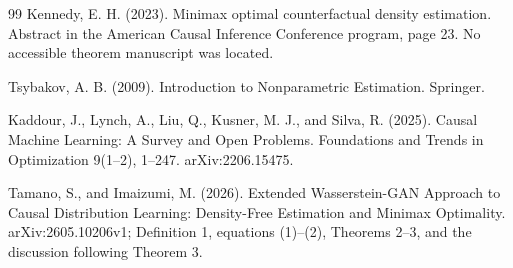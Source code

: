 \documentclass{article}
\begin{document}
\begin{thebibliography}{99}
   Kennedy, E. H. (2023). Minimax optimal counterfactual density estimation. Abstract in the American Causal Inference Conference program, page 23. No accessible theorem manuscript was located.

   Tsybakov, A. B. (2009). Introduction to Nonparametric Estimation. Springer.

   Kaddour, J., Lynch, A., Liu, Q., Kusner, M. J., and Silva, R. (2025). Causal Machine Learning: A Survey and Open Problems. Foundations and Trends in Optimization 9(1--2), 1--247. arXiv:2206.15475.

   Tamano, S., and Imaizumi, M. (2026). Extended Wasserstein-GAN Approach to Causal Distribution Learning: Density-Free Estimation and Minimax Optimality. arXiv:2605.10206v1; Definition 1, equations (1)--(2), Theorems 2--3, and the discussion following Theorem 3.

\end{thebibliography}
\end{document}
